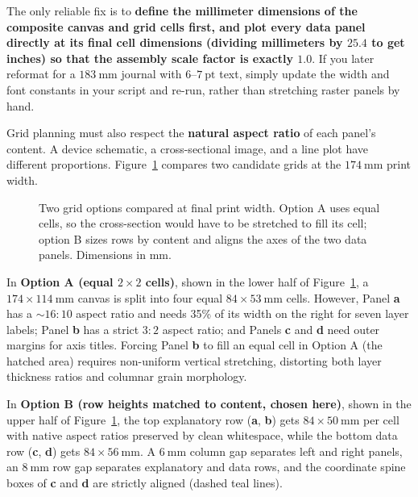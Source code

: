 The only reliable fix is to \textbf{define the millimeter dimensions of the composite canvas and grid cells first, and plot every data panel directly at its final cell dimensions (dividing millimeters by $25.4$ to get inches) so that the assembly scale factor is exactly $1.0$}. If you later reformat for a $183\ \text{mm}$ journal with $6\text{--}7\ \text{pt}$ text, simply update the width and font constants in your script and re-run, rather than stretching raster panels by hand.

Grid planning must also respect the \textbf{natural aspect ratio} of each panel's content. A device schematic, a cross-sectional image, and a line plot have different proportions. Figure~\ref{fig:ch09-02} compares two candidate grids at the $174\ \text{mm}$ print width.

\begin{figure}[htbp]\centering
\resizebox{0.84\linewidth}{!}{}
\caption{Two grid options compared at final print width. Option A uses equal cells, so the cross-section would have to be stretched to fill its cell; option B sizes rows by content and aligns the axes of the two data panels. Dimensions in mm.}\label{fig:ch09-02}
\end{figure}

In \textbf{Option A (equal $2 \times 2$ cells)}, shown in the lower half of Figure~\ref{fig:ch09-02}, a $174 \times 114\ \text{mm}$ canvas is split into four equal $84 \times 53\ \text{mm}$ cells. However, Panel \textbf{a} has a $\sim 16:10$ aspect ratio and needs 35\% of its width on the right for seven layer labels; Panel \textbf{b} has a strict $3:2$ aspect ratio; and Panels \textbf{c} and \textbf{d} need outer margins for axis titles. Forcing Panel \textbf{b} to fill an equal cell in Option A (the hatched area) requires non-uniform vertical stretching, distorting both layer thickness ratios and columnar grain morphology.

In \textbf{Option B (row heights matched to content, chosen here)}, shown in the upper half of Figure~\ref{fig:ch09-02}, the top explanatory row (\textbf{a}, \textbf{b}) gets $84 \times 50\ \text{mm}$ per cell with native aspect ratios preserved by clean whitespace, while the bottom data row (\textbf{c}, \textbf{d}) gets $84 \times 56\ \text{mm}$. A $6\ \text{mm}$ column gap separates left and right panels, an $8\ \text{mm}$ row gap separates explanatory and data rows, and the coordinate spine boxes of \textbf{c} and \textbf{d} are strictly aligned (dashed teal lines).

